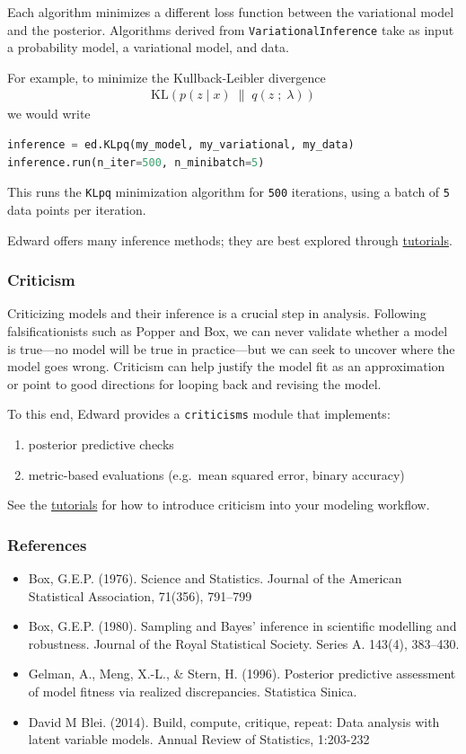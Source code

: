 Each algorithm minimizes a different loss function between the variational model
and the posterior. Algorithms derived from \texttt{VariationalInference}
take as input a probability model, a variational model, and data.

For example, to minimize the Kullback-Leibler divergence
\begin{align*}
  \text{KL}(p(z \mid x) \;\|\; q(z \;;\; \lambda))
\end{align*}
we would write
\begin{lstlisting}[language=Python]
inference = ed.KLpq(my_model, my_variational, my_data)
inference.run(n_iter=500, n_minibatch=5)
\end{lstlisting}
This runs the \texttt{KLpq} minimization algorithm for \texttt{500} iterations,
using a batch of \texttt{5} data points per iteration.

Edward offers many inference methods; they are best explored through
\href{tutorials.html}{tutorials}.

\subsubsection{Criticism}\label{criticism}

Criticizing models and their inference is a crucial step in analysis.
Following
falsificationists such as Popper and Box, we can never validate
whether a model is true---no model will be true in practice---but we
can seek to uncover where the model goes wrong. Criticism can
help justify the model fit as an approximation or point to good directions
for looping back and revising the model.

To this end, Edward provides a \texttt{criticisms} module that implements:
\begin{enumerate}
  \item posterior predictive checks
  \item metric-based evaluations (e.g.~mean squared error, binary accuracy)
\end{enumerate}

See the \href{tutorials.html}{tutorials} for how to introduce criticism into
your modeling workflow.

\subsubsection{References}\label{references}

\begin{itemize}
\item
  Box, G.E.P. (1976). Science and Statistics. Journal of the American
  Statistical Association, 71(356), 791–799
\item
  Box, G.E.P. (1980). Sampling and Bayes' inference in scientific modelling and
  robustness. Journal of the Royal Statistical Society. Series A. 143(4), 383–430.
\item
  Gelman, A., Meng, X.-L., \& Stern, H. (1996). Posterior predictive assessment
  of model fitness via realized discrepancies. Statistica Sinica.
\item
  David M Blei. (2014). Build, compute, critique, repeat: Data analysis with
  latent variable models. Annual Review of Statistics, 1:203-232
\end{itemize}
